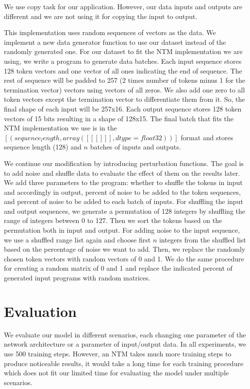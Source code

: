 \documentclass[acmsmall]{acmart}
\begin{document}
We use copy task for our application. However, our data inputs and outputs are different and we are not using it for copying the input to output.

This implementation uses random sequences of vectors as the data. We implement a new data generator function to use our dataset instead of the randomly generated one. For our dataset to fit the NTM implementation we are using, we write a program to generate data batches. Each input sequence stores 128 token vectors and one vector of all ones indicating the end of sequence. The rest of sequence will be padded to 257 (2 times number of tokens minus 1 for the termination vector) vectors using vectors of all zeros. We also add one zero to all token vectors except the termination vector to differentiate them from it. So, the final shape of each input will be 257x16. Each output sequence stores 128 token vectors of 15 bits resulting in a shape of 128x15. The final batch that fits the NTM implementation we use is in the $[(sequence_length, array([[[]]], dtype=float32))]$ format and stores sequence length (128) and $n$ batches of inputs and outputs.

We continue our modification by introducing perturbation functions. The goal is to add noise and shuffle data to evaluate the effect of them on the results later. We add three parameters to the program: whether to shuffle the tokens in input and accordingly in output, percent of noise to be added to the token sequences, and percent of noise to be added to each batch of inputs. For shuffling the input and output sequences, we generate a permutation of 128 integers by shuffling the range of integers between 0 to 127. Then we sort the tokens based on the permutation both in input and output. For adding noise to the input sequence, we use a shuffled range list again and choose first $n$ integers from the shuffled list based on the percentage of noise we want to add. Then, we replace the randomly chosen token vectors with random vectors of 0 and 1. We do the same procedure for creating a random matrix of 0 and 1 and replace the indicated percent of generated input programs with random matrices.

\section{Evaluation}
We evaluate our model in different scenarios, each changing one parameter of the network architecture or a parameter of input/output data. In all experiments, we use 500 training steps. However, an NTM takes much more training steps to produce noticeable results, it would take a long time for each training procedure which does not fit our limited time for evaluating the model under multiple scenarios.
\end{document}
